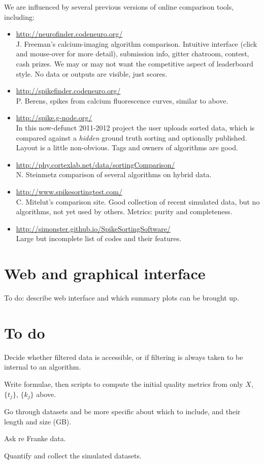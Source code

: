 \documentclass[10pt]{article}
\newcommand{\bi}{\begin{itemize}}
\newcommand{\ei}{\end{itemize}}
\begin{document}
We are influenced by several previous versions of online
comparison tools, including:
\bi
\item \url{http://neurofinder.codeneuro.org/}\\
  J. Freeman's calcium-imaging algorithm comparison.
  Intuitive interface (click and mouse-over for more detail), submission info,
  gitter chatroom, contest, cash prizes.
  We may or may not want the competitive aspect of leaderboard style.
  No data or outputs are visible, just scores.
\item \url{http://spikefinder.codeneuro.org/}\\
  P. Berens, spikes from calcium fluorescence curves, similar to above.
\item \url{http://spike.g-node.org/}\\
  In this now-defunct
  2011-2012 project the user
  uploads sorted data, which is compared against a {\em hidden} ground truth sorting and optionally published. Layout is a little non-obvious.
  Tags and owners of algorithms are good.
\item \url{http://phy.cortexlab.net/data/sortingComparison/}\\
  N. Steinmetz comparison of several algorithms on hybrid data.
\item \url{http://www.spikesortingtest.com/}\\
  C. Mitelut's comparison site. Good collection of recent
  simulated data, but
  no algorithms, not yet used by others. Metrics: purity and completeness.
\item \url{http://simonster.github.io/SpikeSortingSoftware/}\\
  Large but incomplete list of codes and their features.
\ei

\section{Web and graphical interface}

To do: describe web interface and which summary plots can be brought up.


\section{To do}

Decide whether filtered data is accessible, or if filtering is always
taken to be internal to an algorithm.

Write formulae, then scripts to compute the initial quality metrics from only
$X$, $\{t_j\}$, $\{k_j\}$ above.

Go through datasets and be more specific about which to include, and their
length and size (GB).

Ask re Franke data.

Quantify and collect the simulated datasets.




\end{document}

